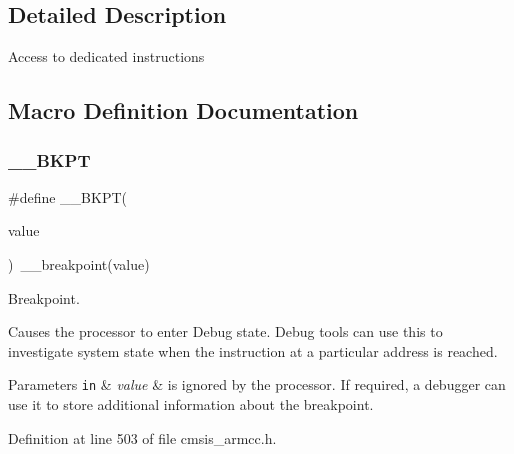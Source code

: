 \subsection{Detailed Description}
Access to dedicated instructions 

\subsection{Macro Definition Documentation}
\mbox{\label{group___c_m_s_i_s___core___instruction_interface_ga15ea6bd3c507d3e81c3b3a1258e46397}} 
\subsubsection{\texorpdfstring{\+\_\+\+\_\+\+B\+K\+PT}{\_\_BKPT}\hspace{0.1cm}{\footnotesize\ttfamily [1/3]}}
{\footnotesize\ttfamily \#define \+\_\+\+\_\+\+B\+K\+PT(\begin{DoxyParamCaption}\item[{}]{value }\end{DoxyParamCaption})~\+\_\+\+\_\+breakpoint(value)}



Breakpoint. 

Causes the processor to enter Debug state. Debug tools can use this to investigate system state when the instruction at a particular address is reached. 
\begin{DoxyParams}[1]{Parameters}
\mbox{\tt in}  & {\em value} & is ignored by the processor. If required, a debugger can use it to store additional information about the breakpoint. \\
\hline
\end{DoxyParams}


Definition at line 503 of file cmsis\+\_\+armcc.\+h.

\mbox{\label{group___c_m_s_i_s___core___instruction_interface_ga15ea6bd3c507d3e81c3b3a1258e46397}} 

